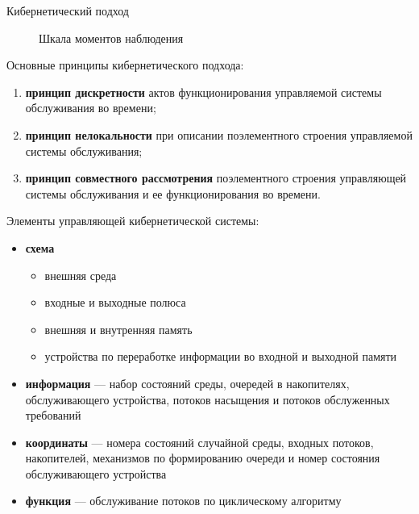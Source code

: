 \documentclass[10pt]{beamer}
\begin{document}
\begin{frame}[allowframebreaks]{Кибернетический подход}
   \begin{figure}[h]
    \centering
    \caption{Шкала моментов наблюдения}
    \label{AZ:fig:3}
  \end{figure}
\framebreak
Основные принципы кибернетического подхода:
  \begin{enumerate}
  \item \textbf{принцип дискретности} актов функционирования управляемой
    системы обслуживания во времени;
  \item \textbf{принцип нелокальности} при описании поэлементного
    строения управляемой системы обслуживания;
  \item \textbf{принцип совместного
    рассмотрения} поэлементного строения управляющей системы
    обслуживания и ее функционирования во времени.
  \end{enumerate}
\framebreak
Элементы управляющей кибернетической системы:
  \begin{itemize}
  \item \textbf{схема}
  \begin{itemize}
      \item внешняя среда
      \item входные и выходные полюса
      \item внешняя и внутренняя память
      \item устройства по переработке информации во входной и выходной памяти
      \end{itemize}
  \item \textbf{информация} --- набор состояний среды, очередей в накопителях, обслуживающего устройства, потоков насыщения и потоков обслуженных требований
  \item \textbf{координаты} --- номера состояний случайной среды, входных потоков, накопителей, механизмов по формированию очереди и номер состояния обслуживающего устройства
  \item \textbf{функция} --- обслуживание потоков по циклическому алгоритму
  \end{itemize}

\end{frame}
\end{document}

